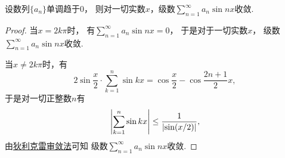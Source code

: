 \begin{example}
设数列\(\{a_n\}\)单调趋于\(0\)，
则对一切实数\(x\)，级数\(\sum_{n=1}^\infty a_n \sin n x\)收敛.
\begin{proof}
当\(x=2k\pi\)时，
有\(\sum_{n=1}^\infty a_n \sin n x = 0\)，
于是对于一切实数\(x\)，
级数\(\sum_{n=1}^\infty a_n \sin n x\)收敛.

当\(x\neq2k\pi\)时，有\[
	2\sin\frac{x}{2} \cdot \sum_{k=1}^n \sin kx
	= \cos\frac{x}{2} - \cos\frac{2n+1}{2}x,
\]
于是对一切正整数\(n\)有\[
	\abs{\sum_{k=1}^n \sin k x}
	\leq \frac1{\abs{\sin(x/2)}},
\]
由\hyperref[theorem:无穷级数.无穷级数的阿贝尔--狄利克雷审敛法]{狄利克雷审敛法}可知
级数\(\sum_{n=1}^\infty a_n \sin n x\)收敛.
\end{proof}
\end{example}

